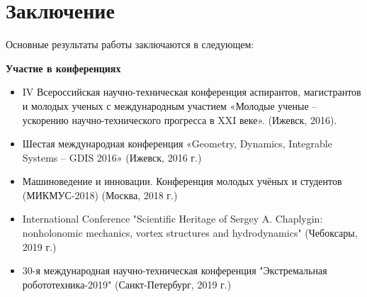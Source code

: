 \chapter*{Заключение}                       %


Основные результаты работы заключаются в следующем:


\textbf{Участие в конференциях}
\begin{itemize}
	\item IV Всероссийская научно-техническая конференция аспирантов, магистрантов и молодых ученых с международным участием «Молодые ученые -- ускорению научно-технического прогресса в XXI веке». (Ижевск, 2016).
	\item Шестая международная конференция «Geometry, Dynamics, Integrable Systems -- GDIS 2016» (Ижевск, 2016 г.)
	\item Машиноведение и инновации. Конференция молодых учёных и студентов (МИКМУС-2018) (Москва, 2018 г.)
	\item International Conference "Scientific Heritage of Sergey A. Chaplygin: nonholonomic mechanics, vortex structures and hydrodynamics" (Чебоксары, 2019 г.)
	\item 30-я международная научно-техническая конференция "Экстремальная робототехника-2019" (Санкт-Петербург, 2019 г.)	
\end{itemize}

